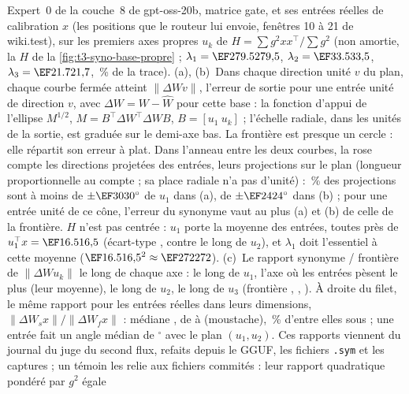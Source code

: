 {Expert~0 de la couche~8 de gpt-oss-20b, matrice gate, et ses \LatNuageN{} entrées réelles de calibration $x$ (les
positions que le routeur lui envoie, fenêtres 10 à 21 de wiki.test), sur les premiers axes propres $u_k$ de
$H=\sum g^2xx^\top/\sum g^2$ (non amortie, la $H$ de la \cref{fig:t3-syno-base-propre} ; $\lambda_1=\LatNuageLambdaUn$,
$\lambda_2=\LatNuageLambdaDeux$, $\lambda_3=\LatNuageLambdaTrois$, \LatNuagePartTrace\,\% de la trace). (a), (b)~Dans
chaque direction unité $v$ du plan, chaque courbe fermée atteint $\lVert\Delta W v\rVert$, l'erreur de sortie pour une
entrée unité de direction $v$, avec $\Delta W=W-\hat W$ pour cette base : la fonction d'appui de l'ellipse $M^{1/2}$,
$M=B^\top\Delta W^\top\Delta W B$, $B=[u_1\ u_k]$ ; l'échelle radiale, dans les unités de la sortie, est graduée sur le
demi-axe bas. La frontière est presque un cercle : elle répartit son erreur à plat. Dans l'anneau entre les deux
courbes, la rose compte les directions projetées des entrées, leurs projections sur le plan (longueur proportionnelle
au compte ; sa place radiale n'a pas d'unité) : \LatNuageConeQuantile\,\% des projections sont à moins de
$\pm\LatNuageConeDouze^\circ$ de $u_1$ dans (a), de $\pm\LatNuageConeTreize^\circ$ dans (b) ; pour une entrée unité de
ce cône, l'erreur du synonyme vaut au plus \LatNuageConeRapportDouze{} (a) et \LatNuageConeRapportTreize{} (b) de celle
de la frontière.
$H$ n'est pas centrée : $u_1$ porte la moyenne des entrées, toutes près de $u_1^\top x=\LatNuageMoyUn$ (écart-type
\LatNuageEcartUn, contre \LatNuageEcartDeux{} le long de $u_2$), et $\lambda_1$ doit l'essentiel à cette moyenne
($\LatNuageMoyUn^2\approx\LatNuageMoyCarre$). (c)~Le rapport synonyme / frontière de $\lVert\Delta W u_k\rVert$ le long
de chaque axe : \LatNuageRapportUn{} le long de $u_1$, l'axe où les entrées pèsent le plus (leur moyenne),
\LatNuageRapportDeux{} le long de $u_2$, \LatNuageRapportTrois{} le long de $u_3$ (frontière \LatNuageErrFUn,
\LatNuageErrFDeux, \LatNuageErrFTrois). À droite du filet, le même rapport pour les \LatNuageN{} entrées réelles dans
leurs \LatDim{} dimensions, $\lVert\Delta W_s x\rVert/\lVert\Delta W_f x\rVert$ : médiane \LatNuageEntreesMed, de
\LatNuageEntreesMin{} à \LatNuageEntreesMax{} (moustache), \LatNuageEntreesSousTete\,\% d'entre elles sous
\LatNuageConeRapport ; une entrée fait un angle médian de \LatNuageAngleMed$^\circ$ avec le plan $(u_1, u_2)$. Ces
rapports viennent du journal du juge du second flux, refaits depuis le GGUF, les fichiers \texttt{.sym} et les
captures ; un témoin les relie aux fichiers commités : leur rapport quadratique pondéré par $g^2$ égale
}
